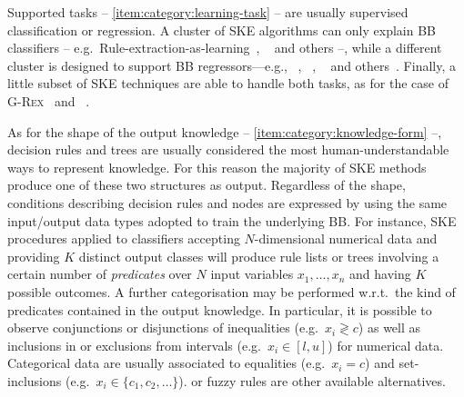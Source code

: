 \documentclass[
]{ceurart}
\begin{document}
Supported tasks -- \cref{item:category:learning-task} -- are usually supervised classification or regression.
%
A cluster of SKE algorithms can only explain BB classifiers -- e.g.\ Rule-extraction-as-learning~\cite{craven1994using}, \trepan~\cite{craven1996extracting} and others \cite{barakat2005eclectic,martens2007comprehensible} --, while a different cluster is designed to support BB regressors---e.g., \iter~\cite{huysmans2006iter}, \gridex~\cite{gridex-extraamas2021}, \gridrex{}~\cite{gridrex-kr2022} and others~\cite{setiono2002extraction,schmitz1999ann,saito2002extracting}.
%
Finally, a little subset of SKE techniques are able to handle both tasks, as for the case of \textsc{G-Rex}~\cite{grex-icdm2008} and \cart~\cite{breiman1984classification}.

As for the shape of the output knowledge -- \cref{item:category:knowledge-form} --, decision rules \cite{freitas2014comprehensible,huysmans2011empirical,murphy1991id2} and trees \cite{quinlan1993c4,simplifyingdt-ijmms27} are usually considered the most human-understandable ways to represent knowledge.
%
For this reason the majority of SKE methods produce one of these two structures as output.
%
Regardless of the shape, conditions describing decision rules and nodes are expressed by using the same input/output data types adopted to train the underlying BB.
%
For instance, SKE procedures applied to classifiers accepting $N$-dimensional numerical data and providing $K$ distinct output classes will produce rule lists or trees involving a certain number of \emph{predicates} over $N$ input variables $x_1, \ldots, x_n$ and having $K$ possible outcomes.
%
A further categorisation may be performed w.r.t.\ the kind of predicates contained in the output knowledge.
%
In particular, it is possible to observe conjunctions or disjunctions of inequalities (e.g.\ $x_i \gtrless c$) as well as inclusions in or exclusions from intervals (e.g.\ $x_i \in [l, u]$) for numerical data.
%
Categorical data are usually associated to equalities (e.g.\ $x_i = c$) and set-inclusions (e.g.\ $x_i \in \{c_1, c_2, \ldots \}$).
%
\mofn{} or fuzzy rules are other available alternatives.
\end{document}
